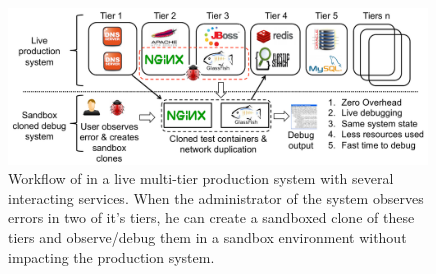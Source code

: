 \begin{figure}[ht!]
	\begin{center}
		\includegraphics[width=0.99\textwidth]{parikshan/figs/workflow3.pdf}
		\caption{Workflow of \parikshan in a live multi-tier production system with several interacting services. When the administrator of the system observes errors in two of it's tiers, he can create a sandboxed clone of these tiers and observe/debug them in a sandbox environment without impacting the production system.}
		\label{fig:motivation}
	\end{center}
\end{figure}